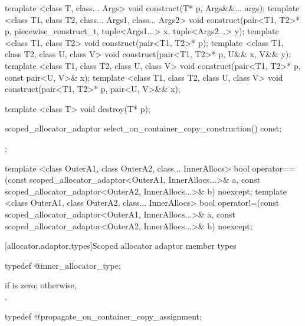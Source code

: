 \begin{codeblock}
{{    template <class T, class... Args>
      void construct(T* p, Args&&... args);
    template <class T1, class T2, class... Args1, class... Args2>
      void construct(pair<T1, T2>* p, piecewise_construct_t,
                     tuple<Args1...> x, tuple<Args2...> y);
    template <class T1, class T2>
      void construct(pair<T1, T2>* p);
    template <class T1, class T2, class U, class V>
      void construct(pair<T1, T2>* p, U&& x, V&& y);
    template <class T1, class T2, class U, class V>
      void construct(pair<T1, T2>* p, const pair<U, V>& x);
    template <class T1, class T2, class U, class V>
      void construct(pair<T1, T2>* p, pair<U, V>&& x);

    template <class T>
      void destroy(T* p);

    scoped_allocator_adaptor select_on_container_copy_construction() const;
  };

  template <class OuterA1, class OuterA2, class... InnerAllocs>
    bool operator==(const scoped_allocator_adaptor<OuterA1, InnerAllocs...>& a,
                    const scoped_allocator_adaptor<OuterA2, InnerAllocs...>& b) noexcept;
  template <class OuterA1, class OuterA2, class... InnerAllocs>
    bool operator!=(const scoped_allocator_adaptor<OuterA1, InnerAllocs...>& a,
                    const scoped_allocator_adaptor<OuterA2, InnerAllocs...>& b) noexcept;
}
\end{codeblock}

[allocator.adaptor.types]{Scoped allocator adaptor member types}

%
%
\begin{itemdecl}
typedef @\seebelow@ inner_allocator_type;
\end{itemdecl}

\begin{itemdescr}
\pnum
\ctype {} if  is
zero; otherwise,\\ .
\end{itemdescr}

%
%
\begin{itemdecl}
typedef @\seebelow@ propagate_on_container_copy_assignment;
\end{itemdecl}

